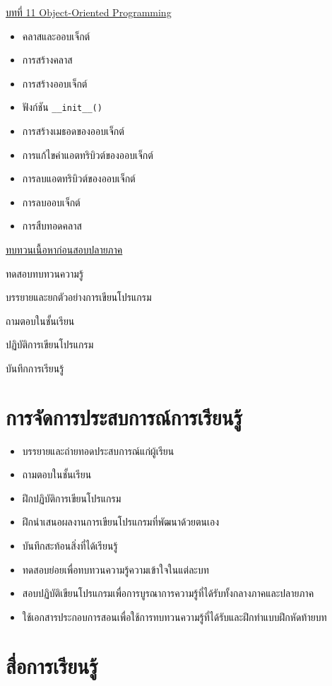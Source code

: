 {
\underline{บทที่ 11 Object-Oriented Programming}
\begin{itemize}
\item คลาสและออบเจ็กต์
\item การสร้างคลาส
\item การสร้างออบเจ็กต์
\item ฟังก์ชัน \texttt{\_\_init\_\_()}
\item การสร้างเมธอดของออบเจ็กต์
\item การแก้ไขค่าแอตทริบิวต์ของออบเจ็กต์
\item การลบแอตทริบิวต์ของออบเจ็กต์
\item การลบออบเจ็กต์
\item การสืบทอดคลาส
\end{itemize}

\underline{ทบทวนเนื้อหาก่อนสอบปลายภาค}
}
{
\item ทดสอบทบทวนความรู้
\item  บรรยายและยกตัวอย่างการเขียนโปรแกรม
\item  ถามตอบในชั้นเรียน
\item  ปฏิบัติการเขียนโปรแกรม
\item  บันทึกการเรียนรู้
}


\section*{การจัดการประสบการณ์การเรียนรู้}

\begin{itemize}
\item บรรยายและถ่ายทอดประสบการณ์แก่ผู้เรียน
\item ถามตอบในชั้นเรียน
\item ฝึกปฏิบัติการเขียนโปรแกรม
\item  ฝึกนำเสนอผลงานการเขียนโปรแกรมที่พัฒนาด้วยตนเอง
\item  บันทึกสะท้อนสิ่งที่ได้เรียนรู้
\item  ทดสอบย่อยเพื่อทบทวนความรู้ความเข้าใจในแต่ละบท
\item  สอบปฏิบัติเขียนโปรแกรมเพื่อการบูรณาการความรู้ที่ได้รับทั้งกลางภาคและปลายภาค
\item  ใช้เอกสารประกอบการสอนเพื่อใช้การทบทวนความรู้ที่ได้รับและฝึกทำแบบฝึกหัดท้ายบท
\end{itemize}


\section*{สื่อการเรียนรู้}

